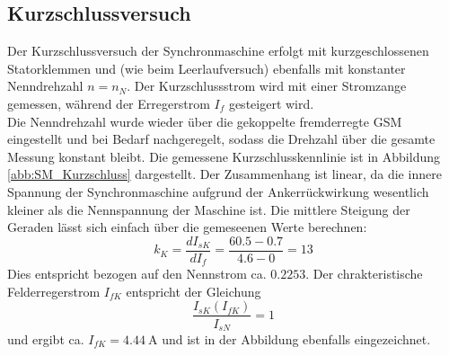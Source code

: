 \subsection{Kurzschlussversuch} 
Der Kurzschlussversuch der Synchronmaschine erfolgt mit kurzgeschlossenen Statorklemmen und (wie beim Leerlaufversuch) ebenfalls mit konstanter Nenndrehzahl $n=n_N$. Der Kurzschlussstrom wird mit einer Stromzange gemessen, während der Erregerstrom $I_f$ gesteigert wird. \\
Die Nenndrehzahl wurde wieder über die gekoppelte fremderregte GSM eingestellt und bei Bedarf nachgeregelt, sodass die Drehzahl über die gesamte Messung konstant bleibt. Die gemessene Kurzschlusskennlinie ist in Abbildung \ref{abb:SM_Kurzschluss} dargestellt. Der Zusammenhang ist linear, da die innere Spannung der Synchronmaschine aufgrund der Ankerrückwirkung wesentlich kleiner als die Nennspannung der Maschine ist. Die mittlere Steigung der Geraden lässt sich einfach über die gemeseenen Werte berechnen:
\begin{equation*}
    k_K = \frac{dI_{sK}}{dI_f} = \frac{60.5 - 0.7}{4.6 - 0} = 13
\end{equation*}
Dies entspricht bezogen auf den Nennstrom ca. $0.2253$. Der chrakteristische Felderregerstrom $I_{fK}$ entspricht der Gleichung 
\begin{equation*}
    \frac{I_{sK}(I_{fK})}{I_{sN}} = 1
\end{equation*}
und ergibt ca. $I_{fK} = \SI{4.44}{\ampere}$ und ist in der Abbildung ebenfalls eingezeichnet.

